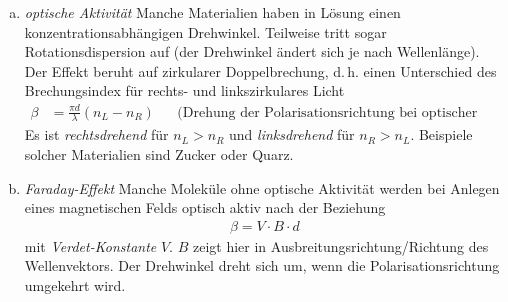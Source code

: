 \begin{enumerate}[a)]
\item \emph{optische Aktivität}
  Manche Materialien haben in Lösung einen konzentrationsabhängigen
  Drehwinkel. Teilweise tritt sogar Rotationsdispersion auf (der
  Drehwinkel ändert sich je nach Wellenlänge).
  Der Effekt beruht auf zirkularer Doppelbrechung, d.\,h. einen
  Unterschied des Brechungsindex für rechts- und linkszirkulares
  Licht
  \begin{align*}
    \beta &= \frac{\pi d}{\lambda}(n_L-n_R)
    && \text{(Drehung der Polarisationsrichtung bei optischer Achse)}
  \end{align*}%
  Es ist \emph{rechtsdrehend} für $n_L>n_R$ 
  und \emph{linksdrehend} für $n_R>n_L$.
  Beispiele solcher Materialien sind Zucker oder Quarz.

\item \emph{Faraday-Effekt}
  Manche Moleküle ohne optische Aktivität werden bei Anlegen eines
  magnetischen Felds optisch aktiv nach der Beziehung
  \begin{gather*}
    \beta = V\cdot B\cdot d
  \end{gather*}
  mit
  \emph{Verdet-Konstante}%
   $V$.
  $B$ zeigt hier in Ausbreitungsrichtung/Richtung des Wellenvektors.
  Der Drehwinkel dreht sich um, wenn die Polarisationsrichtung umgekehrt
  wird.
\end{enumerate}




